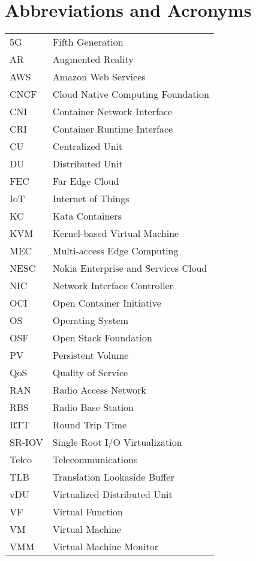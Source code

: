 \chapter*{Abbreviations and Acronyms}

\noindent
\begin{longtable}{@{}p{}p{}@{}}
5G & Fifth Generation \\
AR & Augmented Reality \\
AWS & Amazon Web Services \\
CNCF & Cloud Native Computing Foundation \\
CNI & Container Network Interface \\
CRI & Container Runtime Interface \\
CU & Centralized Unit \\
DU & Distributed Unit \\
FEC & Far Edge Cloud \\
IoT & Internet of Things \\
KC & Kata Containers \\
KVM & Kernel-based Virtual Machine \\
MEC & Multi-access Edge Computing \\
NESC & Nokia Enterprise and Services Cloud \\
NIC & Network Interface Controller \\
OCI & Open Container Initiative \\
OS & Operating System \\
OSF & Open Stack Foundation \\
PV & Persistent Volume \\
QoS & Quality of Service \\
RAN & Radio Access Network \\
RBS & Radio Base Station \\
RTT & Round Trip Time \\
SR-IOV & Single Root I/O Virtualization \\
Telco & Telecommunications \\
TLB & Translation Lookaside Buffer \\
vDU & Virtualized Distributed Unit \\
VF & Virtual Function \\
VM & Virtual Machine \\
VMM & Virtual Machine Monitor \\



\end{longtable}
